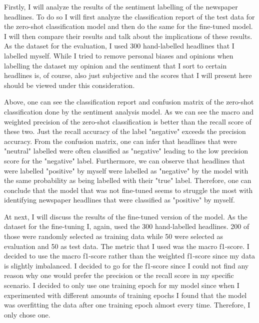 \documentclass[11pt, a4paper, leqno]{article}
\begin{document}
Firstly, I will analyze the results of the sentiment labelling of the newspaper headlines. To do so I will first analyze the classification report of the test data for the zero-shot classification model and then do the same for the fine-tuned model. I will then compare their results and talk about the implications of these results. As the dataset for the evaluation, I used 300 hand-labelled headlines that I labelled myself. While I tried to remove personal biases and opinions when labelling the dataset my opinion and the sentiment that I sort to certain headlines is, of course, also just subjective and the scores that I will present here should be viewed under this consideration.







Above, one can see the classification report and confusion matrix of the zero-shot classification done by the sentiment analysis model. As we can see the macro and weighted precision of the zero-shot classification is better than the recall score of these two. Just the recall accuracy of the label "negative" exceeds the precision accuracy. From the confusion matrix, one can infer that headlines that were "neutral" labelled were often classified as "negative" leading to the low precision score for the "negative" label. Furthermore, we can observe that headlines that were labelled "positive" by myself were labelled as "negative" by the model with the same probability as being labelled with their "true" label. Therefore, one can conclude that the model that was not fine-tuned seems to struggle the most with identifying newspaper headlines that were classified as "positive" by myself.

At next, I will discuss the results of the fine-tuned version of the model. As the dataset for the fine-tuning I, again, used the 300 hand-labelled headlines. 200 of those were randomly selected as training data while 50 were selected as evaluation and 50 as test data. The metric that I used was the macro f1-score. I decided to use the macro f1-score rather than the weighted f1-score since my data is slightly imbalanced. I decided to go for the f1-score since I could not find any reason why one would prefer the precision or the recall score in my specific scenario.
I decided to only use one training epoch for my model since when I experimented with different amounts of training epochs I found that the model was overfitting the data after one training epoch almost every time. Therefore, I only chose one.
\end{document}
